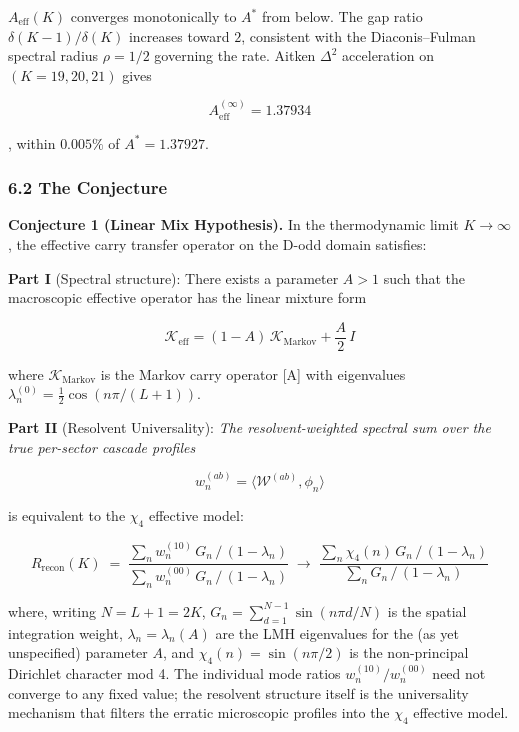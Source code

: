 \documentclass[
  11pt,
]{article}
\begin{document}
\(A_{\mathrm{eff}}(K)\) converges monotonically to \(A^{\ast}\) from below. The
gap ratio \(\delta(K-1)/\delta(K)\) increases toward \(2\), consistent with the
Diaconis--Fulman spectral radius \(\rho = 1/2\) governing the rate. Aitken
\(\Delta^2\) acceleration on \((K = 19, 20, 21)\) gives

\[A_{\mathrm{eff}}^{(\infty)} = 1.37934\]

, within \(0.005\%\) of \(A^{\ast} = 1.37927\).

\subsubsection{6.2 The Conjecture}\label{the-conjecture}

\textbf{Conjecture 1 (Linear Mix Hypothesis).} In the thermodynamic limit
\(K \to \infty\), the effective carry transfer operator on the D-odd domain
satisfies:

\textbf{Part I} (Spectral structure): There exists a parameter \(A > 1\) such
that the macroscopic effective operator has the linear mixture form

\[\mathcal{K}_{\mathrm{eff}} = (1 - A)\,\mathcal{K}_{\mathrm{Markov}} + \frac{A}{2}\,I\]

where \(\mathcal{K}_{\mathrm{Markov}}\) is the Markov carry operator {[}A{]}
with eigenvalues \(\lambda_n^{(0)} = \tfrac{1}{2}\cos(n\pi/(L+1))\).

\textbf{Part II} (Resolvent Universality): \emph{The resolvent-weighted spectral
sum over the true per-sector cascade profiles}

\[w_n^{(ab)} = \langle \mathcal{W}^{(ab)}, \phi_n \rangle\]

is equivalent to the \(\chi_4\) effective model:

\[R_{\mathrm{recon}}(K) \;=\; \frac{\sum_n w_n^{(10)} \, G_n \, / \, (1 - \lambda_n)}{\sum_n w_n^{(00)} \, G_n \, / \, (1 - \lambda_n)} \;\longrightarrow\; \frac{\sum_n \chi_4(n) \, G_n \, / \, (1 - \lambda_n)}{\sum_n G_n \, / \, (1 - \lambda_n)}\]

where, writing \(N = L+1 = 2K\), \(G_n = \sum_{d=1}^{N-1} \sin(n\pi d/N)\) is
the spatial integration weight, \(\lambda_n = \lambda_n(A)\) are the LMH
eigenvalues for the (as yet unspecified) parameter \(A\), and
\(\chi_4(n) = \sin(n\pi/2)\) is the non-principal Dirichlet character mod 4. The
individual mode ratios \(w_n^{(10)}/w_n^{(00)}\) need not converge to any fixed
value; the resolvent structure itself is the universality mechanism that filters
the erratic microscopic profiles into the \(\chi_4\) effective model.
\end{document}
